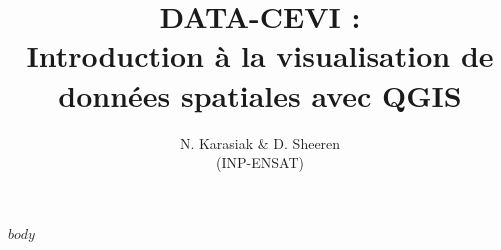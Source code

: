 \documentclass[12]{scrartcl}
\begin{document}
\title{DATA-CEVI :\\ Introduction à la visualisation de données spatiales avec QGIS}
\date{}
\author{N. Karasiak \& D. Sheeren \\(INP-ENSAT)}
\maketitle
\tableofcontents
\pagebreak

$body$
\end{document}
